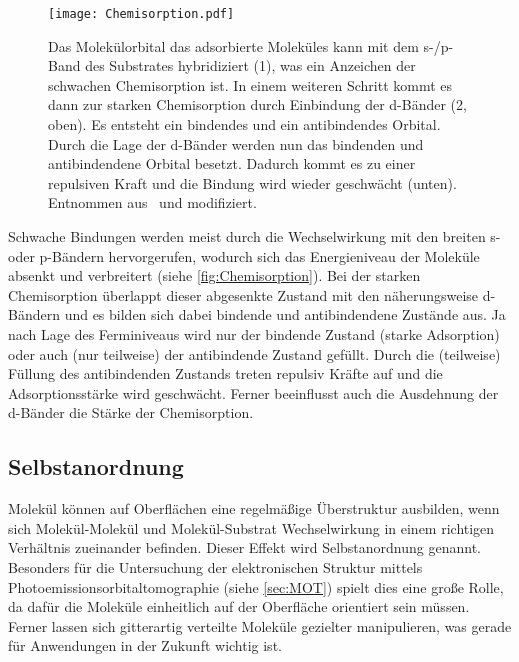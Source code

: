            \begin{figure}
                \centering
                \texttt{[image: Chemisorption.pdf]}
                \caption{Das Molekülorbital das adsorbierte Moleküles kann mit dem s-/p-Band des Substrates hybridiziert (1), was ein Anzeichen der schwachen Chemisorption ist.
                In einem weiteren Schritt kommt es dann zur starken Chemisorption durch Einbindung der d-Bänder (2, oben).
                Es entsteht ein bindendes und ein antibindendes Orbital.
                Durch die Lage der d-Bänder werden nun das bindenden und antibindendene Orbital besetzt.
                Dadurch kommt es zu einer repulsiven Kraft und die Bindung wird wieder geschwächt (unten).
                Entnommen aus~\cite{IF_1} und modifiziert.}
                \label{fig:Chemisorption}
            \end{figure}
            Schwache Bindungen werden meist durch die Wechselwirkung mit den breiten s- oder p-Bändern hervorgerufen, wodurch sich das Energieniveau der Moleküle absenkt und verbreitert (siehe \autoref{fig:Chemisorption}).
            Bei der starken Chemisorption überlappt dieser abgesenkte Zustand mit den näherungsweise d-Bändern und es bilden sich dabei bindende und antibindendene Zustände aus.
            Ja nach Lage des Ferminiveaus wird nur der bindende Zustand (starke Adsorption) oder auch (nur teilweise) der antibindende Zustand gefüllt.
            Durch die (teilweise) Füllung des antibindenden Zustands treten repulsiv Kräfte auf und die Adsorptionsstärke wird geschwächt.
            Ferner beeinflusst auch die Ausdehnung der d-Bänder die Stärke der Chemisorption.

        \FloatBarrier
        \subsection{Selbstanordnung} \label{sec:Selbstanordnung}
            Molekül können auf Oberflächen eine regelmäßige Überstruktur ausbilden, wenn sich Molekül-Molekül und Molekül-Substrat Wechselwirkung in einem richtigen Verhältnis zueinander befinden.
            Dieser Effekt wird Selbstanordnung genannt.
            Besonders für die Untersuchung der elektronischen Struktur mittels Photoemissionsorbitaltomographie (siehe \autoref{sec:MOT}) spielt dies eine große Rolle, da dafür die Moleküle einheitlich auf der Oberfläche orientiert sein müssen.
            Ferner lassen sich gitterartig verteilte Moleküle gezielter manipulieren, was gerade für Anwendungen in der Zukunft wichtig ist.
            
